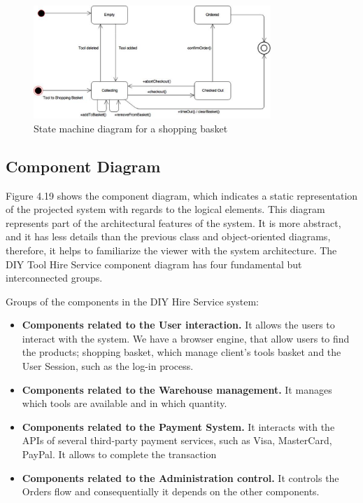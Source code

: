 \begin{figure}[H]
      \centering
      \includegraphics[trim = 0 0 0 0, clip, width=0.8\textwidth]{TempImg/BasketSM.png}
      \caption{State machine diagram for a shopping basket}
\end{figure}

\hypertarget{component-diagram}{%
\subsection{Component Diagram}\label{component-diagram}}

Figure 4.19 shows the component diagram, which indicates a static
representation of the projected system with regards to the logical
elements. This diagram represents part of the architectural features of
the system. It is more abstract, and it has less details than the
previous class and object-oriented diagrams, therefore, it helps to
familiarize the viewer with the system architecture. The DIY Tool Hire
Service component diagram has four fundamental but interconnected
groups.

Groups of the components in the DIY Hire Service system:

\begin{itemize}
  \item \textbf{Components related to the User interaction.} It allows the users to interact with the system. We have a browser engine, that allow users to find the products; shopping basket, which manage client’s tools basket and the User Session, such as the log-in process.
  \item \textbf{Components related to the Warehouse management.} It manages which tools are available and in which quantity.
  \item \textbf{Components related to the Payment System.} It interacts with the APIs of several third-party payment services, such as Visa, MasterCard, PayPal. It allows to complete the transaction
  \item \textbf{Components related to the Administration control.} It controls the Orders flow and consequentially it depends on the other components. 
\end{itemize}

